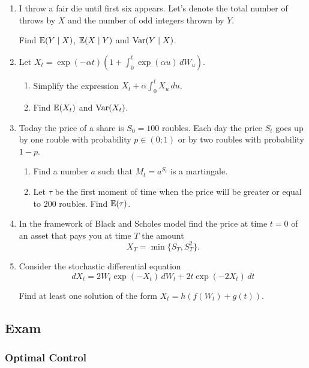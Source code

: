 \documentclass[12pt, a4paper]{article}
\begin{document}
\begin{enumerate}
\item I throw a fair die until first six appears. Let's denote the total number of throws by $X$ and the number of odd integers thrown by $Y$.

Find $\operatorname{\mathbb{E}}(Y \mid X)$, $\operatorname{\mathbb{E}}(X \mid Y)$ and $\operatorname{Var}(Y \mid X)$.
\item Let $X_t = \exp(-\alpha t) \left(1 + \int_0^t \exp(\alpha u)\, dW_u \right)$.
\begin{enumerate}
  \item Simplify the expression $X_t  + \alpha \int_0^t X_u \, du$.
  \item Find $\operatorname{\mathbb{E}}(X_t)$ and $\operatorname{Var}(X_t)$.
\end{enumerate}
\item Today the price of a share is $S_0=100$ roubles. Each day the price $S_t$ goes up  by one rouble with probability $p\in (0;1)$ or by two roubles with probability $1-p$.
\begin{enumerate}
  \item Find a number $a$ such that $M_t = a^{S_t}$ is a martingale.
  \item Let $\tau$ be the first moment of time when the price will be greater or equal to 200 roubles. Find $\operatorname{\mathbb{E}}(\tau)$.
\end{enumerate}

\item In the framework of Black and Scholes model find the price at time $t=0$ of an asset that pays you at time $T$ the amount
\[
X_T = \min\{S_T, S_T^2\}.
\]

\item Consider the stochastic differential equation
\[
dX_t = 2W_t \exp(-X_t)\, dW_t + 2t \exp(-2X_t)\, dt
\]

Find at least one solution of the form $X_t = h(f(W_t) + g(t))$.

\end{enumerate}




\subsection{Exam}

\subsubsection*{Optimal Control}
\end{document}
